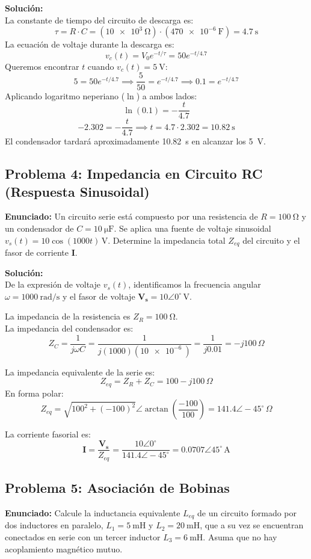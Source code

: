 \documentclass[12pt, a4paper]{article}
\begin{document}
\textbf{Solución:}\\
La constante de tiempo del circuito de descarga es:
\[ \tau = R \cdot C = (\SI{10e3}{\ohm}) \cdot (\SI{470e-6}{\farad}) = \SI{4.7}{\second} \]
La ecuación de voltaje durante la descarga es:
\[ v_c(t) = V_0 e^{-t/\tau} = 50 e^{-t/4.7} \]
Queremos encontrar $t$ cuando $v_c(t) = \SI{5}{\volt}$:
\[ 5 = 50 e^{-t/4.7} \implies \frac{5}{50} = e^{-t/4.7} \implies 0.1 = e^{-t/4.7} \]
Aplicando logaritmo neperiano ($\ln$) a ambos lados:
\[ \ln(0.1) = -\frac{t}{4.7} \]
\[ -2.302 = -\frac{t}{4.7} \implies t = 4.7 \cdot 2.302 = \SI{10.82}{\second} \]
El condensador tardará aproximadamente \SI{10.82}{\second} en alcanzar los \SI{5}{\volt}.

\subsection*{Problema 4: Impedancia en Circuito RC (Respuesta Sinusoidal)}
\textbf{Enunciado:} Un circuito serie está compuesto por una resistencia de $R = \SI{100}{\ohm}$ y un condensador de $C = \SI{10}{\micro\farad}$. Se aplica una fuente de voltaje sinusoidal $v_s(t) = 10\cos(1000t)\,\text{V}$. Determine la impedancia total $Z_{eq}$ del circuito y el fasor de corriente $\mathbf{I}$.

\textbf{Solución:}\\
De la expresión de voltaje $v_s(t)$, identificamos la frecuencia angular $\omega = \SI{1000}{\radian\per\second}$ y el fasor de voltaje $\mathbf{V_s} = 10 \angle 0^\circ\,\text{V}$.

La impedancia de la resistencia es $Z_R = \SI{100}{\ohm}$.\\
La impedancia del condensador es:
\[ Z_C = \frac{1}{j\omega C} = \frac{1}{j(1000)(\SI{10e-6}{})} = \frac{1}{j0.01} = -j100\,\Omega \]

La impedancia equivalente de la serie es:
\[ Z_{eq} = Z_R + Z_C = 100 - j100\,\Omega \]
En forma polar:
\[ Z_{eq} = \sqrt{100^2 + (-100)^2} \angle \arctan\left(\frac{-100}{100}\right) = 141.4 \angle -45^\circ\,\Omega \]

La corriente fasorial es:
\[ \mathbf{I} = \frac{\mathbf{V_s}}{Z_{eq}} = \frac{10 \angle 0^\circ}{141.4 \angle -45^\circ} = 0.0707 \angle 45^\circ\,\text{A} \]

\subsection*{Problema 5: Asociación de Bobinas}
\textbf{Enunciado:} Calcule la inductancia equivalente $L_{eq}$ de un circuito formado por dos inductores en paralelo, $L_1 = \SI{5}{\milli\henry}$ y $L_2 = \SI{20}{\milli\henry}$, que a su vez se encuentran conectados en serie con un tercer inductor $L_3 = \SI{6}{\milli\henry}$. Asuma que no hay acoplamiento magnético mutuo.
\end{document}
